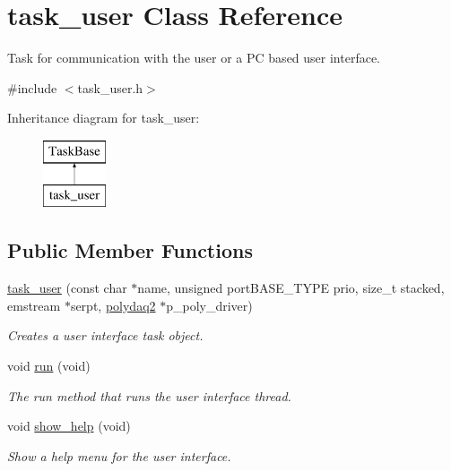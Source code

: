 \hypertarget{classtask__user}{\section{task\-\_\-user Class Reference}
\label{classtask__user}
}


Task for communication with the user or a P\-C based user interface.  




{\ttfamily \#include $<$task\-\_\-user.\-h$>$}

Inheritance diagram for task\-\_\-user\-:\begin{figure}[H]
\begin{center}
\leavevmode
\includegraphics[height=2.000000cm]{classtask__user}
\end{center}
\end{figure}
\subsection*{Public Member Functions}
\begin{DoxyCompactItemize}
\item 
\hyperlink{classtask__user_a17401926939e6b241f7b32397e020b2f}{task\-\_\-user} (const char $\ast$name, unsigned port\-B\-A\-S\-E\-\_\-\-T\-Y\-P\-E prio, size\-\_\-t stacked, emstream $\ast$serpt, \hyperlink{classpolydaq2}{polydaq2} $\ast$p\-\_\-poly\-\_\-driver)
\begin{DoxyCompactList}\small\item\em Creates a user interface task object. \end{DoxyCompactList}\item 
void \hyperlink{classtask__user_adca6429d57be25e8d411414fc8ad75af}{run} (void)
\begin{DoxyCompactList}\small\item\em The run method that runs the user interface thread. \end{DoxyCompactList}\item 
void \hyperlink{classtask__user_ae80867cb9ac50e8f1df7ba391ce7723d}{show\-\_\-help} (void)
\begin{DoxyCompactList}\small\item\em Show a help menu for the user interface. \end{DoxyCompactList}\end{DoxyCompactItemize}
